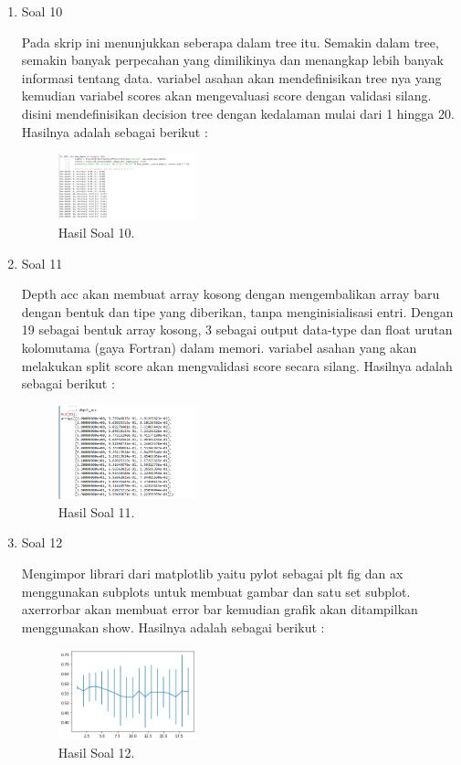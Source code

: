 \begin{enumerate}
	\item Soal 10
	\hfill\break
	
	Pada skrip ini menunjukkan seberapa dalam tree itu. Semakin dalam tree, semakin banyak perpecahan yang dimilikinya dan menangkap lebih banyak informasi tentang data. variabel asahan akan mendefinisikan tree nya yang kemudian variabel scores akan mengevaluasi score dengan validasi silang. disini mendefinisikan decision tree dengan kedalaman mulai dari 1 hingga 20. Hasilnya adalah sebagai berikut :
	\begin{figure}[H]
	\centering
		\includegraphics[width=4cm]{figures/1174015/tugas2/materi/hasil10.PNG}
		\caption{Hasil Soal 10.}
	\end{figure}

	\item Soal 11
	\hfill\break
	
	Depth acc akan membuat array kosong dengan mengembalikan array baru dengan bentuk dan tipe yang diberikan, tanpa menginisialisasi entri. Dengan 19 sebagai bentuk array kosong, 3 sebagai output data-type dan float urutan kolomutama (gaya Fortran) dalam memori. variabel asahan yang akan melakukan split score akan mengvalidasi score secara silang. Hasilnya adalah sebagai berikut :
	\begin{figure}[H]
	\centering
		\includegraphics[width=4cm]{figures/1174015/tugas2/materi/hasil11.PNG}
		\caption{Hasil Soal 11.}
	\end{figure}

	\item Soal 12
	\hfill\break
	
	Mengimpor librari dari matplotlib yaitu pylot sebagai plt fig dan ax menggunakan subplots untuk membuat gambar dan satu set subplot. axerrorbar akan membuat error bar kemudian grafik akan ditampilkan menggunakan show. Hasilnya adalah sebagai berikut :
	\begin{figure}[H]
	\centering
		\includegraphics[width=4cm]{figures/1174015/tugas2/materi/hasil12.PNG}
		\caption{Hasil Soal 12.}
	\end{figure}
\end{enumerate}

